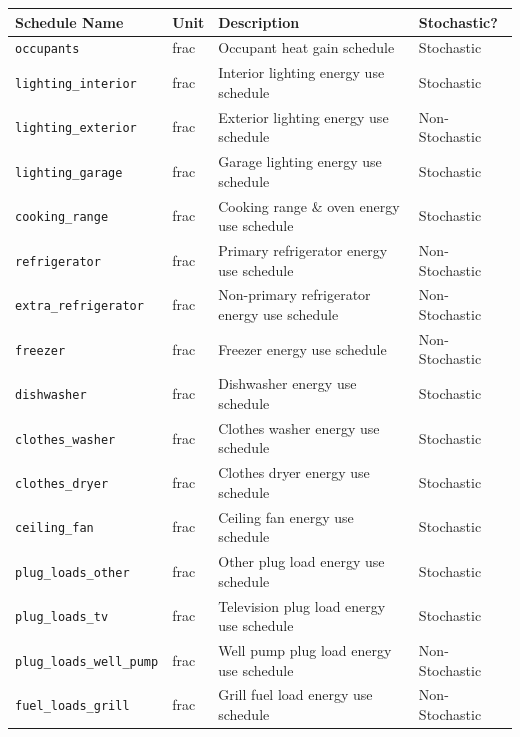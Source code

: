 \begin{table}
    \centering
    \scriptsize
    \begin{tabular}{l|l|l|l}
    \hline
    Schedule Name & Unit & Description & Stochastic? \\
    \hline
    \texttt{occupants} & frac & Occupant heat gain schedule & Stochastic \\
    \texttt{lighting\_interior} & frac & Interior lighting energy use schedule & Stochastic \\
    \texttt{lighting\_exterior} & frac & Exterior lighting energy use schedule & Non-Stochastic \\ 
    \texttt{lighting\_garage} & frac & Garage lighting energy use schedule & Stochastic \\
    \texttt{cooking\_range} & frac & Cooking range \& oven energy use schedule & Stochastic \\
    \texttt{refrigerator} & frac & Primary refrigerator energy use schedule & Non-Stochastic \\
    \texttt{extra\_refrigerator} & frac & Non-primary refrigerator energy use schedule & Non-Stochastic \\
    \texttt{freezer} & frac & Freezer energy use schedule & Non-Stochastic \\
    \texttt{dishwasher} & frac & Dishwasher energy use schedule & Stochastic \\
    \texttt{clothes\_washer} & frac & Clothes washer energy use schedule & Stochastic \\
    \texttt{clothes\_dryer} & frac & Clothes dryer energy use schedule & Stochastic \\
    \texttt{ceiling\_fan} & frac & Ceiling fan energy use schedule & Stochastic \\
    \texttt{plug\_loads\_other} & frac & Other plug load energy use schedule & Stochastic \\
    \texttt{plug\_loads\_tv} & frac & Television plug load energy use schedule & Stochastic \\
    \texttt{plug\_loads\_well\_pump} & frac & Well pump plug load energy use schedule & Non-Stochastic \\
    \texttt{fuel\_loads\_grill} & frac & Grill fuel load energy use schedule & Non-Stochastic \\

\end{tabular}
\end{table}
